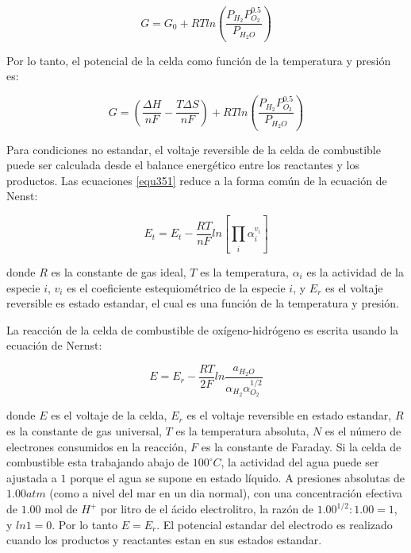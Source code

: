 \documentclass[12pt]{book}
\theoremstyle{definition}
\theoremstyle{remark}
\theoremstyle{plain}
\begin{document}
\begin{equation}
 \label{equ349}
G = G_0 + RT ln \left (  \frac{P_{H_2} P_{O_2}^{0.5} }{P_{H_2O}} \right )
\end{equation}

Por lo tanto, el potencial de la celda como función de la temperatura y presión es:


\begin{equation}
 \label{equ350}
G = \left (  \frac{\Delta H}{n F} - \frac{T \Delta S}{n F}  \right ) + RT ln \left (  \frac{P_{H_2} P_{O_2}^{0.5} }{P_{H_2O}} \right )
\end{equation}


Para condiciones no estandar, el voltaje reversible de la celda de combustible
puede ser calculada desde el balance energético entre los reactantes y los productos.
Las ecuaciones \ref{equ351} reduce a la forma común de la ecuación de Nenst:


\begin{equation}
 \label{equ351}
E_t= E_t-\frac{RT}{nF}ln [\prod_{\substack{i}}\alpha _i^{v_i}]
\end{equation}

donde $R$ es la constante de gas ideal, $T$ es la temperatura, $\alpha _i$ es la 
actividad de la especie $i$, $v_i$ es el coeficiente estequiométrico de la especie $i$,
y $E_r$ es el voltaje reversible es estado estandar, el cual es una función de la
temperatura y presión.

La reacción de la celda de combustible de oxígeno-hidrógeno es escrita usando la
ecuación de Nernst:

\begin{equation}
 \label{equ352}
E=E_r- \frac{RT}{2F}ln \frac{a_{H_2O}}{\alpha _{H_2}\alpha _{O_2}^{1/2}}
\end{equation}

donde $E$ es el voltaje de la celda, $E_r$ es el voltaje reversible en estado estandar,
$R$ es la constante de gas universal, $T$ es la temperatura absoluta, $N$ es el
número de electrones consumidos en la reacción, $F$ es la constante de Faraday. Si
la celda de combustible esta trabajando abajo de $100^\circ C$, la actividad del
agua puede ser ajustada a $1$ porque el agua se supone en estado líquido. A presiones
absolutas de $1.00 atm$ (como a nivel del mar en un dia normal), con una concentración 
efectiva de $1.00$ mol de $H^+$ por litro de el ácido electrolitro, la razón de
$1.00^{1/2}:1.00=1$, y $ln 1=0$. Por lo tanto $E=E_r$. El potencial estandar del 
electrodo es realizado cuando los productos y reactantes estan en sus estados estandar.
\end{document}
